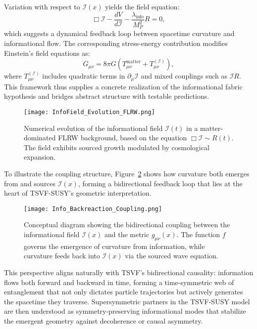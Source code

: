 \documentclass[twocolumn,superscriptaddress,floatfix]{revtex4-2}
\begin{document}
Variation with respect to \(\mathcal{I}(x)\) yields the field equation:
\begin{equation}
\Box \mathcal{I} - \frac{dV}{d\mathcal{I}} - \frac{\lambda_{\text{info}}}{M_P^2} R = 0,
\label{eq:info-eom}
\end{equation}
which suggests a dynamical feedback loop between spacetime curvature and informational flow. The corresponding stress-energy contribution modifies Einstein’s field equations as:
\begin{equation}
G_{\mu\nu} = 8\pi G \left( T_{\mu\nu}^{\text{matter}} + T_{\mu\nu}^{(\mathcal{I})} \right),
\end{equation}
where \(T_{\mu\nu}^{(\mathcal{I})}\) includes quadratic terms in \(\partial_\mu \mathcal{I}\) and mixed couplings such as \(\mathcal{I} R\). This framework thus supplies a concrete realization of the informational fabric hypothesis and bridges abstract structure with testable predictions.

\begin{figure}[htbp]
    \centering
    \texttt{[image: InfoField\_Evolution\_FLRW.png]}
    \caption{Numerical evolution of the informational field \(\mathcal{I}(t)\) in a matter-dominated FLRW background, based on the equation \(\Box \mathcal{I} \sim R(t)\). The field exhibits sourced growth modulated by cosmological expansion.}
    \label{fig:info-dynamics-flrw}
\end{figure}

To illustrate the coupling structure, Figure~\ref{fig:info-backreaction} shows how curvature both emerges from and sources \(\mathcal{I}(x)\), forming a bidirectional feedback loop that lies at the heart of TSVF-SUSY’s geometric interpretation.

\begin{figure}[htbp]
    \centering
    \texttt{[image: Info\_Backreaction\_Coupling.png]}
    \caption{Conceptual diagram showing the bidirectional coupling between the informational field \(\mathcal{I}(x)\) and the metric \(g_{\mu\nu}(x)\). The function \(f\) governs the emergence of curvature from information, while curvature feeds back into \(\mathcal{I}(x)\) via the sourced wave equation.}
    \label{fig:info-backreaction}
\end{figure}

This perspective aligns naturally with TSVF’s bidirectional causality: information flows both forward and backward in time, forming a time-symmetric web of entanglement that not only dictates particle trajectories but actively generates the spacetime they traverse. Supersymmetric partners in the TSVF-SUSY model are then understood as symmetry-preserving informational modes that stabilize the emergent geometry against decoherence or causal asymmetry.
\end{document}
